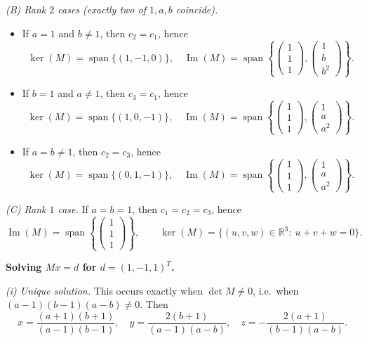 \documentclass[12pt,a4paper]{article}
\theoremstyle{plain}
\theoremstyle{definition}      %
\begin{document}
\emph{(B) Rank \(2\) cases (exactly two of \(1,a,b\) coincide).}
\begin{itemize}
	\item If \(a=1\) and \(b\neq 1\), then \(c_2=c_1\), hence
	\[
	\ker(M)=\operatorname{span}\{(1,-1,0)\},\quad
	\operatorname{Im}(M)=\operatorname{span}\left\{\begin{pmatrix}1\\1\\1\end{pmatrix},\begin{pmatrix}1\\b\\b^2\end{pmatrix}\right\}.
	\]
	\item If \(b=1\) and \(a\neq 1\), then \(c_3=c_1\), hence
	\[
	\ker(M)=\operatorname{span}\{(1,0,-1)\},\quad
	\operatorname{Im}(M)=\operatorname{span}\left\{\begin{pmatrix}1\\1\\1\end{pmatrix},\begin{pmatrix}1\\a\\a^2\end{pmatrix}\right\}.
	\]
	\item If \(a=b\neq 1\), then \(c_2=c_3\), hence
	\[
	\ker(M)=\operatorname{span}\{(0,1,-1)\},\quad
	\operatorname{Im}(M)=\operatorname{span}\left\{\begin{pmatrix}1\\1\\1\end{pmatrix},\begin{pmatrix}1\\a\\a^2\end{pmatrix}\right\}.
	\]
\end{itemize}

\emph{(C) Rank \(1\) case.}
If \(a=b=1\), then \(c_1=c_2=c_3\), hence
\[
\operatorname{Im}(M)=\operatorname{span}\left\{\begin{pmatrix}1\\1\\1\end{pmatrix}\right\},\qquad
\ker(M)=\{(u,v,w)\in\mathbb R^3:\ u+v+w=0\}.
\]

\textbf{Solving \(Mx=d\) for \(d=(1,-1,1)^T\).}

\emph{(i) Unique solution.}
This occurs exactly when \(\det M\neq 0\), i.e.\ when \((a-1)(b-1)(a-b)\neq 0\).
Then
\[
x=\frac{(a+1)(b+1)}{(a-1)(b-1)},\quad
y=\frac{2(b+1)}{(a-1)(a-b)},\quad
z=-\frac{2(a+1)}{(b-1)(a-b)}.
\]
\end{document}
